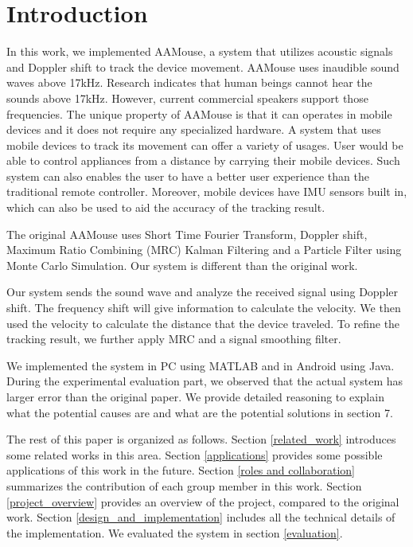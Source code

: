 \documentclass{acm_proc_article-sp}
\begin{document}
\section{Introduction}
In this work, we implemented AAMouse, a system that utilizes
acoustic signals and Doppler shift to track the device movement.
AAMouse uses inaudible sound waves above 17kHz.
Research indicates that human beings cannot hear the sounds above
17kHz. However, current commercial speakers support those frequencies.
The unique property of AAMouse is that it can operates in mobile 
devices and it does not require any specialized hardware. A system
that uses mobile devices to track its movement can offer a variety
of usages. User would be able to control appliances from a distance by carrying their mobile devices. Such system can also 
enables the user to have a better user experience than the traditional
remote controller. Moreover, mobile devices have IMU sensors built in,
which can also be used to aid the accuracy of the tracking result.

The original AAMouse uses Short Time Fourier Transform, Doppler shift, Maximum Ratio 
Combining (MRC) Kalman Filtering and a
Particle Filter using Monte Carlo Simulation. Our system is different than the original work. 

Our system sends the sound wave and analyze the received signal using
Doppler shift. The frequency shift will give information to 
calculate the velocity. We then used the velocity to calculate the
distance that the device traveled. To refine the tracking result,
we further apply MRC and a signal smoothing
filter. 

We implemented the system in PC using MATLAB and in Android using
Java. During the 
experimental evaluation part, we observed that the actual system has
larger error than the original paper.
We provide detailed
reasoning to explain what the potential causes are and what are the
potential solutions in section 7.

The rest of this paper is organized as follows.
Section
\ref{related_work} introduces some related works in this area.
Section \ref{applications} provides some possible applications of
this work in the future. Section \ref{roles and collaboration}
summarizes the contribution of each group member in this work. 
Section \ref{project_overview} provides an overview of the project,
compared to the original work. Section \ref{design_and_implementation}
includes all the technical details of the implementation. We evaluated
the system in section \ref{evaluation}.
\end{document}
